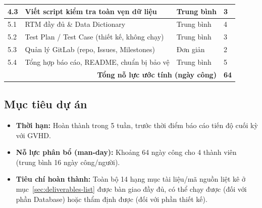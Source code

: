 \begin{table}[htbp]
{\begin{tabular}{|p{1cm}|p{7cm}|p{2.3cm}|p{2cm}|}
        \hline
        4.3 & Viết script kiểm tra toàn vẹn dữ liệu & Trung bình & 3 \\
        \hline
        5.1 & RTM đầy đủ \& Data Dictionary & Trung bình & 4 \\
        \hline
        5.2 & Test Plan / Test Case (thiết kế, không chạy) & Trung bình & 3 \\
        \hline
        5.3 & Quản lý GitLab (repo, Issues, Milestones) & Đơn giản & 2 \\
        \hline
        5.4 & Tổng hợp báo cáo, README, chuẩn bị bảo vệ & Trung bình & 5 \\
        \hline
        \multicolumn{3}{|r|}{\textbf{Tổng nỗ lực ước tính (ngày công)}} & \textbf{64} \\
        \hline
    \end{tabular}
    }
\end{table}

\subsection{Mục tiêu dự án}
\begin{itemize}
    \item \textbf{Thời hạn:} Hoàn thành trong 5 tuần, trước thời điểm báo cáo tiến độ cuối kỳ với GVHD.
    \item \textbf{Nỗ lực phân bổ (man-day):} Khoảng 64 ngày công cho 4 thành viên (trung bình 16 ngày công/người).
    \item \textbf{Tiêu chí hoàn thành:} Toàn bộ 14 hạng mục tài liệu/mã nguồn liệt kê ở mục~\ref{sec:deliverables-list} được bàn giao đầy đủ, có thể chạy được (đối với phần Database) hoặc thẩm định được (đối với phần thiết kế).
\end{itemize}

